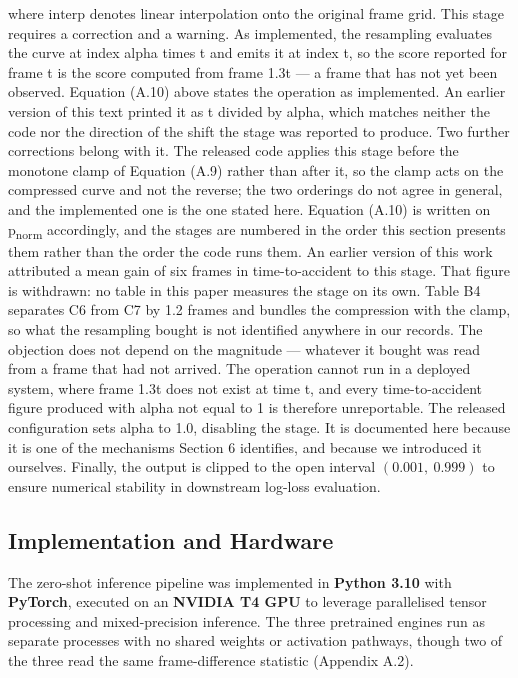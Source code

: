 where \(\text{interp}\) denotes linear interpolation onto the original frame grid. This stage requires a correction and a warning. As implemented, the resampling evaluates the curve at index alpha times t and emits it at index t, so the score reported for frame t is the score computed from frame 1.3t --- a frame that has not yet been observed. Equation (A.10) above states the operation as implemented. An earlier version of this text printed it as t divided by alpha, which matches neither the code nor the direction of the shift the stage was reported to produce. Two further corrections belong with it. The released code applies this stage before the monotone clamp of Equation (A.9) rather than after it, so the clamp acts on the compressed curve and not the reverse; the two orderings do not agree in general, and the implemented one is the one stated here. Equation (A.10) is written on p\textsubscript{norm} accordingly, and the stages are numbered in the order this section presents them rather than the order the code runs them. An earlier version of this work attributed a mean gain of six frames in time-to-accident to this stage. That figure is withdrawn: no table in this paper measures the stage on its own. Table B4 separates C6 from C7 by 1.2 frames and bundles the compression with the clamp, so what the resampling bought is not identified anywhere in our records. The objection does not depend on the magnitude --- whatever it bought was read from a frame that had not arrived. The operation cannot run in a deployed system, where frame 1.3t does not exist at time t, and every time-to-accident figure produced with alpha not equal to 1 is therefore unreportable. The released configuration sets alpha to 1.0, disabling the stage. It is documented here because it is one of the mechanisms Section 6 identifies, and because we introduced it ourselves. Finally, the output is clipped to the open interval \((0.001,\ 0.999)\) to ensure numerical stability in downstream log-loss evaluation.


\subsection{Implementation and Hardware}

The zero-shot inference pipeline was implemented in \textbf{Python 3.10} with \textbf{PyTorch}, executed on an \textbf{NVIDIA T4 GPU} to leverage parallelised tensor processing and mixed-precision inference. The three pretrained engines run as separate processes with no shared weights or activation pathways, though two of the three read the same frame-difference statistic (Appendix A.2).


